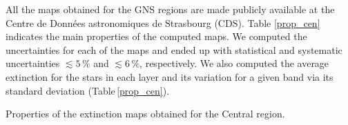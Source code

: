 \documentclass{aa}
\begin{document}
All the maps obtained for the GNS regions are made publicly available at the Centre de Données astronomiques de Strasbourg (CDS). Table \ref{prop_cen} indicates the main properties of the computed maps. We computed the uncertainties for each of the maps and ended up with statistical and systematic uncertainties $\lesssim5\,\%$ and $\lesssim6\,\%$, respectively. We also computed the average extinction for the stars in each layer and its variation for a given band via its standard deviation (Table\,\ref{prop_cen}). 




    




\begin{table*}[t!]
\caption{Properties of the extinction maps obtained for the Central region.}
\label{prop_cen} 
\begin{center}
\def\arraystretch{1.4}
\setlength{\tabcolsep}{3.8pt}



\end{center}
\end{table*}
\end{document}
